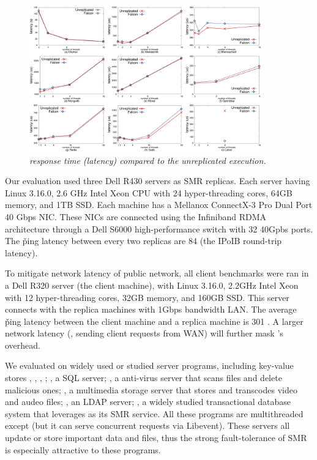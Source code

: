 \begin{figure}[t]
\centering
\includegraphics[width=0.9\textwidth]{figures/latency}
\vspace{-.10in}
\caption{\small {\em \xxx response time (latency) compared to the unreplicated 
execution.}}
\vspace{-.20in}
\label{fig:latency}
\end{figure}

Our evaluation used three Dell R430 servers as SMR replicas. Each server having 
Linux 3.16.0, 2.6 GHz Intel Xeon CPU with 24 hyper-threading cores, 64GB 
memory, and 1TB SSD. Each machine has a Mellanox ConnectX-3 Pro Dual Port 40 
Gbps NIC. These NICs are connected using the Infiniband RDMA architecture 
through a Dell S6000 high-performance switch with 32 40Gpbs ports. The \v{ping} 
latency between every two replicas are 84 \us (the IPoIB round-trip latency).

To mitigate network latency of public network, all client benchmarks were ran 
in a Dell R320 server (the client machine), with Linux 3.16.0, 2.2GHz Intel 
Xeon with 12 hyper-threading cores, 32GB memory, and 160GB SSD. This server 
connects with the replica machines with 1Gbps bandwidth LAN. The average 
\v{ping} latency between the client machine and a replica machine is 301 \us. A 
larger network latency (\eg, sending client requests from WAN) will further 
mask \xxx's overhead.

We evaluated \xxx on \nprog widely used or studied server programs, including 
\nkvprog key-value stores \redis, \memcached, \ssdb, \mongodb; \mysql, a SQL 
server; \clamav, a anti-virus server that scans files and delete malicious ones; 
\mediatomb, a multimedia storage server that stores and transcodes video and 
audeo files; \openldap, an LDAP server; \calvin, a widely studied transactional 
database system that leverages \zookeeper as its SMR service. All these programs 
are multithreaded except \redis (but it can serve concurrent requests via 
Libevent). These servers all update or store important data and files, thus the 
strong fault-tolerance of SMR is especially attractive to these programs.

